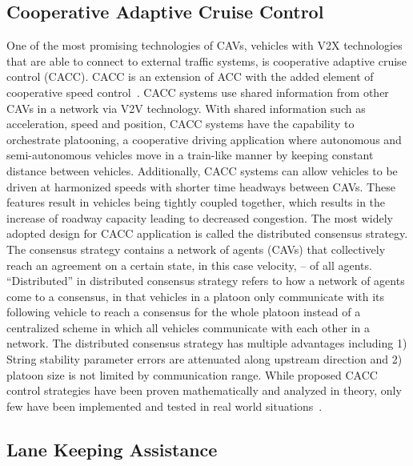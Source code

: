 \documentclass{article}
\begin{document}
\subsection{Cooperative Adaptive Cruise Control}

One of the most promising technologies of CAVs, vehicles with V2X technologies that are able to connect to external traffic systems, is cooperative adaptive cruise control (CACC). CACC is an extension of ACC with the added element of cooperative speed control~\cite{Wang2018}. CACC systems use shared information from other CAVs in a network via V2V technology. With shared information such as acceleration, speed and position, CACC systems have the capability to orchestrate platooning, a cooperative driving application where autonomous and semi-autonomous vehicles move in a train-like manner by keeping constant distance between vehicles.  Additionally, CACC systems can allow vehicles to be driven at harmonized speeds with shorter time headways between CAVs. These features result in vehicles being tightly coupled together, which results in the increase of roadway capacity leading to decreased congestion. The most widely adopted design for CACC application is called the distributed consensus strategy. The consensus strategy contains a network of agents (CAVs) that collectively reach an agreement on a certain state, in this case velocity, -- of all agents. “Distributed” in distributed consensus strategy refers to how a network of agents come to a consensus, in that vehicles in a platoon only communicate with its following vehicle to reach a consensus for the whole platoon instead of a centralized scheme in which all vehicles communicate with each other in a network. The distributed consensus strategy has multiple advantages including 1) String stability parameter errors are attenuated along upstream direction and 2) platoon size is not limited by communication range. While proposed CACC control strategies have been proven mathematically and analyzed in theory, only few have been implemented and tested in real world situations~\cite{Wang2018}.

\subsection{Lane Keeping Assistance}
\end{document}
